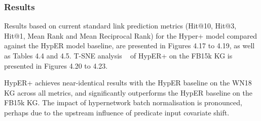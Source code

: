 \subsubsection{Results}
Results based on current standard link prediction metrics (Hit@10, Hit@3, Hit@1, Mean Rank and Mean Reciprocal Rank) for the Hyper+ model compared against the HypER model baseline, are presented in Figures 4.17 to 4.19, as well as Tables 4.4 and 4.5. T-SNE analysis \unskip ~\citep{maaten2008visualizing} of HypER+ on the FB15k KG is presented in Figures 4.20 to 4.23. \par

\noindent HypER+ achieves near-identical results with the HypER baseline on the WN18 KG across all metrics, and significantly outperforms the HypER baseline on the FB15k KG. The impact of hypernetwork batch normalisation is pronounced, perhaps due to the upstream influence of predicate input covariate shift. 

\bigskip
\bigskip



